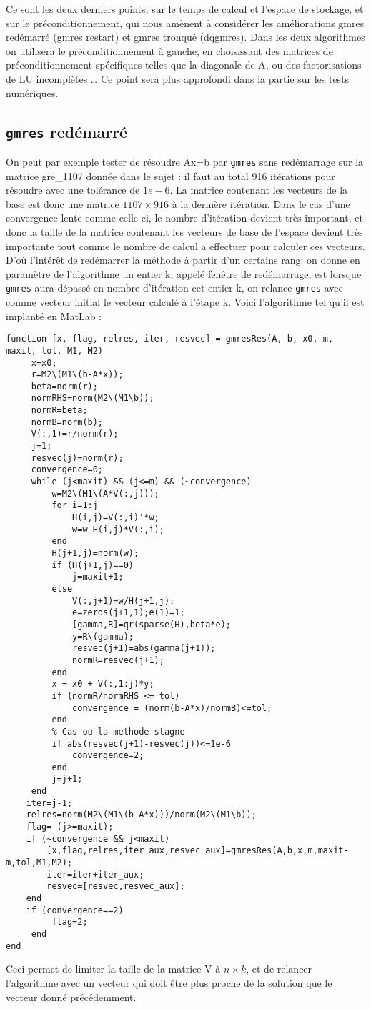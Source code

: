 Ce sont les deux derniers points, sur le temps de calcul et l'espace de stockage, et sur le préconditionnement, qui nous amènent à considérer les améliorations gmres redémarré (gmres restart) et gmres tronqué (dqgmres). Dans les deux algorithmes on utilisera le préconditionnement à gauche, en choisissant des matrices de préconditionnement spécifiques telles que la diagonale de A, ou des factorisations de LU incomplètes … Ce point sera plus approfondi dans la partie sur les tests numériques. 

\subsection{\texttt{gmres} redémarré}
On peut par exemple tester de résoudre Ax=b par \texttt{gmres} sans redémarrage sur la matrice gre\_1107 donnée dans le sujet : il faut au total 916 itérations pour résoudre avec une tolérance de \(1e-6\). La matrice contenant les vecteurs de la base est donc une matrice \(1107 \times 916\) à la dernière itération. Dans le cas d'une convergence lente comme celle ci, le nombre d'itération devient très important, et donc la taille de la matrice contenant les vecteurs de base de l'espace devient très importante tout comme le nombre de calcul a effectuer pour calculer ces vecteurs. D'où l’intérêt de redémarrer la méthode à partir d'un certains rang: on donne en paramètre de l’algorithme un entier k, appelé fenêtre de redémarrage, est lorsque \texttt{gmres} aura dépassé en nombre d'itération cet entier k, on relance \texttt{gmres} avec comme vecteur initial le vecteur calculé à l'étape k. 
\newpage
Voici l'algorithme tel qu'il est implanté en MatLab :
\begin{lstlisting}
function [x, flag, relres, iter, resvec] = gmresRes(A, b, x0, m, maxit, tol, M1, M2)
     x=x0;
     r=M2\(M1\(b-A*x));
     beta=norm(r);
     normRHS=norm(M2\(M1\b));
     normR=beta;
     normB=norm(b);
     V(:,1)=r/norm(r);
     j=1;
     resvec(j)=norm(r);
     convergence=0;
     while (j<maxit) && (j<=m) && (~convergence)
         w=M2\(M1\(A*V(:,j)));
         for i=1:j
             H(i,j)=V(:,i)'*w;
             w=w-H(i,j)*V(:,i);
         end
         H(j+1,j)=norm(w);
         if (H(j+1,j)==0)
             j=maxit+1;
         else
             V(:,j+1)=w/H(j+1,j);
             e=zeros(j+1,1);e(1)=1;
             [gamma,R]=qr(sparse(H),beta*e);
             y=R\(gamma);
             resvec(j+1)=abs(gamma(j+1));
             normR=resvec(j+1);
         end
         x = x0 + V(:,1:j)*y;
         if (normR/normRHS <= tol)
             convergence = (norm(b-A*x)/normB)<=tol;
         end
         % Cas ou la methode stagne
         if abs(resvec(j+1)-resvec(j))<=1e-6
             convergence=2;
         end
         j=j+1;
     end
    iter=j-1;
    relres=norm(M2\(M1\(b-A*x)))/norm(M2\(M1\b));
    flag= (j>=maxit);
    if (~convergence && j<maxit)
        [x,flag,relres,iter_aux,resvec_aux]=gmresRes(A,b,x,m,maxit-m,tol,M1,M2);
        iter=iter+iter_aux;
        resvec=[resvec,resvec_aux];
    end    
    if (convergence==2)
         flag=2;
     end
end
\end{lstlisting}
 Ceci permet de limiter la taille de la matrice V à \(n\times k\), et de relancer l'algorithme avec un vecteur qui doit être plus proche de la solution que le vecteur donné précédemment. 
 \newpage
